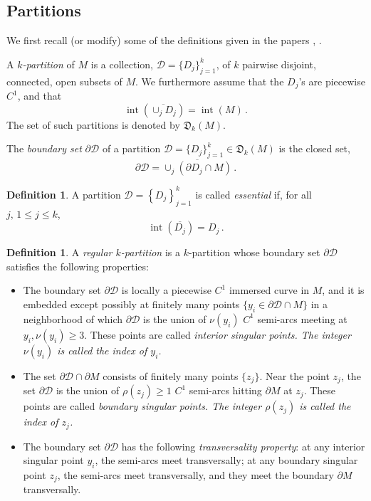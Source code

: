 \documentclass[12pt,a4paper]{amsart}
\theoremstyle{plain} %
\theoremstyle{definition}
\newtheorem{definition}[theorem]{Definition}
\numberwithin{equation}{section}
\numberwithin{figure}{section}
\numberwithin{table}{section}
\newcommand{\cD}{\mathcal{D}}
\DeclareMathOperator{\inte}{int}
\newcommand{\set}[1]{\left\lbrace #1 \right\rbrace}
\newcommand{\bD}{\partial \cD}
\begin{document}
\subsection{Partitions}\label{SS-parti}

We first recall (or modify) some of the definitions given in the papers \cite{BeHe2014}, \cite{BoHe2017}.\medskip

A \emph{$k$-partition} of $M$ is a collection,  $\cD = \{D_j\}_{j=1}^{k}$, of $k$ pairwise disjoint, connected, open subsets of $M$. We furthermore assume that the $D_j$'s are piecewise $C^1$, and that
%
\begin{equation}\label{E-parti-str}
\inte(\overline{\cup_j D_j} ) = \inte(M)\,.
\end{equation}
%
The set of such partitions is denoted by $\mathfrak{D}_k(M)$. \medskip

The \emph{boundary set} $\partial \mathcal{D}$ of a partition
$\mathcal{D} = \{D_j\}_{j=1}^{k} \in \mathfrak{D}_k(M)$ is the
closed set,
%
\begin{equation}
\partial \mathcal{D} = \overline{\cup_j(\partial D_j \cap M)}\,.
\end{equation}


\begin{definition}\label{D-parti-ess}
A partition $\cD = \set{D_j}_{j=1}^k$ is called \emph{essential} if, for all $j, \,1 \le j \le k$,
%
\begin{equation}\label{E-parti-ess}
\inte(\overline{D_j} ) = D_j\,.
\end{equation}
\end{definition}%

\begin{definition}\label{D-parti-reg}
A \emph{regular $k$-partition} is a $k$-partition
whose boundary set $\bD$ satisfies the following properties:
\begin{itemize}
    \item[(i)] The boundary set $\bD$ is locally a piecewise $C^1$  immersed curve in $M$,  and it is embedded
    except possibly at finitely many points $\{y_i \in \bD \cap
    M\}$ in a neighborhood of which $\bD$ is the union of
    $\nu(y_i)$ $C^1$ semi-arcs meeting at $y_i, \nu(y_i) \ge 3$.  These points are called \emph{interior singular points. The integer $\nu(y_i)$ is called the index of $y_i$.}
    \item[(ii)] The set $\bD \cap \partial M$ consists of finitely
    many points $\{z_j\}$. Near the point $z_j$, the set $\bD$ is the
    union of $\rho(z_j)\ge 1$ $C^1$ semi-arcs hitting $\partial M$ at $z_j$.  These points are called \emph{boundary singular points. The integer $\rho(z_j)$ is called the index of $z_j$.}
    \item[(iii)] The boundary set $\bD$ has the following \emph{transversality property}:
    at any interior singular point $y_i$, the semi-arcs meet transversally; at any boundary singular point $z_j$, the semi-arcs meet transversally, and they meet  the boundary $\partial M$ transversally.
\end{itemize}
\end{definition}%
\end{document}
